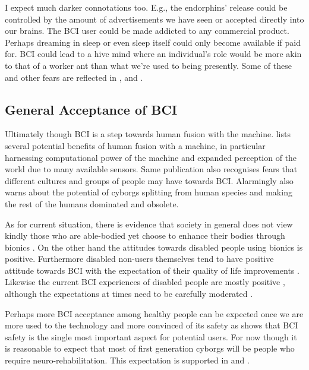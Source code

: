 \documentclass[fleqn,11pt]{olplainarticle}
\begin{document}
I expect much darker connotations too. E.g., the endorphins' release could be controlled by the amount of advertisements we have seen or accepted directly into our brains. The BCI user could be made addicted to any commercial product. Perhaps dreaming in sleep or even sleep itself could only become available if paid for. BCI could lead to a hive mind where an individual's role would be more akin to that of a worker ant than what we're used to being presently. Some of these and other fears are reflected in \cite{liberatore_2021}, \cite{kogel2019using} and \cite{warwick2003cyborg}.

\subsection{General Acceptance of BCI}
Ultimately though BCI is a step towards human fusion with the machine. \cite{warwick2003cyborg} lists several potential benefits of human fusion with a machine, in particular harnessing computational power of the machine and expanded perception of the world due to many available sensors. Same publication also recognises fears that different cultures and groups of people may have towards BCI. Alarmingly \cite{warwick2003cyborg} also warns about the potential of cyborgs splitting from human species and making the rest of the humans dominated and obsolete.

As for current situation, there is evidence that society in general does not view kindly those who are able-bodied yet choose to enhance their bodies through bionics \cite {meyer2018disabled}. On the other hand the attitudes towards disabled people using bionics is positive. Furthermore disabled non-users themselves tend to have positive attitude towards BCI with the expectation of their quality of life improvements \cite{kogel2019using}. Likewise the current BCI experiences of disabled people are mostly positive \cite{kogel2020like}, although the expectations at times need to be carefully moderated \cite{glannon2014ethical}.

Perhaps more BCI acceptance among healthy people can be expected once we are more used to the technology and more convinced of its safety as \cite{kawala2021summary} shows that BCI safety is the single most important aspect for potential users. For now though it is reasonable to expect that most of first generation cyborgs will be people who require neuro-rehabilitation. This expectation is supported in \cite{schalk2008brain} and \cite{kogel2019using}.
\end{document}
